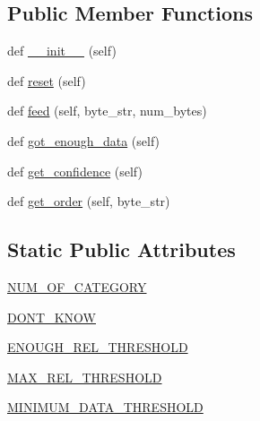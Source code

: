 \subsection*{Public Member Functions}
\begin{DoxyCompactItemize}
\item 
def \hyperlink{classpip_1_1__vendor_1_1chardet_1_1jpcntx_1_1JapaneseContextAnalysis_ad3c8611e01e7a27ebd6bc10cebbb7740}{\+\_\+\+\_\+init\+\_\+\+\_\+} (self)
\item 
def \hyperlink{classpip_1_1__vendor_1_1chardet_1_1jpcntx_1_1JapaneseContextAnalysis_a6757960a65eca5d82c259096a087ab53}{reset} (self)
\item 
def \hyperlink{classpip_1_1__vendor_1_1chardet_1_1jpcntx_1_1JapaneseContextAnalysis_a27e160a4a05947cc260430e10540a126}{feed} (self, byte\+\_\+str, num\+\_\+bytes)
\item 
def \hyperlink{classpip_1_1__vendor_1_1chardet_1_1jpcntx_1_1JapaneseContextAnalysis_a04b8a28fff2ff10ab32dd39ba694eb66}{got\+\_\+enough\+\_\+data} (self)
\item 
def \hyperlink{classpip_1_1__vendor_1_1chardet_1_1jpcntx_1_1JapaneseContextAnalysis_ac6d15561d72c23a3da77a956e333c45d}{get\+\_\+confidence} (self)
\item 
def \hyperlink{classpip_1_1__vendor_1_1chardet_1_1jpcntx_1_1JapaneseContextAnalysis_ab474b14c0185a527593b2ff15e5b4889}{get\+\_\+order} (self, byte\+\_\+str)
\end{DoxyCompactItemize}
\subsection*{Static Public Attributes}
\begin{DoxyCompactItemize}
\item 
\hyperlink{classpip_1_1__vendor_1_1chardet_1_1jpcntx_1_1JapaneseContextAnalysis_a7abb17982d31b1cadc39d38a12f08de3}{N\+U\+M\+\_\+\+O\+F\+\_\+\+C\+A\+T\+E\+G\+O\+RY}
\item 
\hyperlink{classpip_1_1__vendor_1_1chardet_1_1jpcntx_1_1JapaneseContextAnalysis_a989af3333e534447f8a465043dea8803}{D\+O\+N\+T\+\_\+\+K\+N\+OW}
\item 
\hyperlink{classpip_1_1__vendor_1_1chardet_1_1jpcntx_1_1JapaneseContextAnalysis_a5021549c817f5e8a0987549941f5529b}{E\+N\+O\+U\+G\+H\+\_\+\+R\+E\+L\+\_\+\+T\+H\+R\+E\+S\+H\+O\+LD}
\item 
\hyperlink{classpip_1_1__vendor_1_1chardet_1_1jpcntx_1_1JapaneseContextAnalysis_a54cfd3c1e2a51f1c4d1657efd80eb937}{M\+A\+X\+\_\+\+R\+E\+L\+\_\+\+T\+H\+R\+E\+S\+H\+O\+LD}
\item 
\hyperlink{classpip_1_1__vendor_1_1chardet_1_1jpcntx_1_1JapaneseContextAnalysis_afd25c1770aa9e65e69a670a919a14405}{M\+I\+N\+I\+M\+U\+M\+\_\+\+D\+A\+T\+A\+\_\+\+T\+H\+R\+E\+S\+H\+O\+LD}
\end{DoxyCompactItemize}


